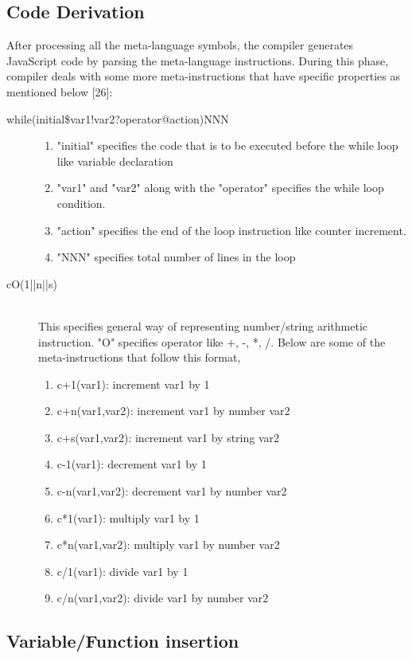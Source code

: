 \subsection{Code Derivation}
After processing all the meta-language symbols, the compiler generates JavaScript code by parsing the meta-language instructions. During this phase, compiler deals with some more meta-instructions that have specific properties as mentioned below [26]:
\begin{description}
\item[while(initial\$var1!var2?operator@action)NNN]\hfill 
\begin{enumerate}
\item "initial" specifies the code that is to be executed before the while loop like variable declaration
\item "var1" and "var2" along with the "operator" specifies the while loop condition.
\item "action" specifies the end of the loop instruction like counter increment.
\item "NNN" specifies total number of lines in the loop
\end{enumerate}

\item[cO(1||n||s)] \hfill \\
This specifies general way of representing number/string arithmetic instruction. "O" specifies operator like +, -, *, /. Below are some of the meta-instructions that follow this format,
\begin{enumerate}
\item c+1(var1): increment var1 by 1
\item c+n(var1,var2): increment var1 by number var2
\item c+s(var1,var2): increment var1 by string var2
\item c-1(var1): decrement var1 by 1
\item c-n(var1,var2): decrement var1 by number var2
\item c*1(var1): multiply var1 by 1
\item c*n(var1,var2): multiply var1 by number var2
\item c/1(var1): divide var1 by 1
\item c/n(var1,var2): divide var1 by number var2 
  \end{enumerate}
\end{description}

\subsection{Variable/Function insertion}

